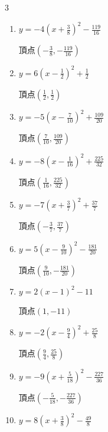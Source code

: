 \begin{multicols}{3}
\begin{enumerate}
        $\displaystyle 頂点\left( -\frac{9}{10} , -\frac{59}{20} \right)$

  \item $\displaystyle y=-4\left( x+\frac{3}{8}\right)^{2}-\frac{119}{16}$

        $\displaystyle 頂点\left( -\frac{3}{8} , -\frac{119}{16} \right)$

  \item $\displaystyle y=6\left( x-\frac{1}{2}\right)^{2}+\frac{1}{2}$

        $\displaystyle 頂点\left( \frac{1}{2} , \frac{1}{2} \right)$

  \item $\displaystyle y=-5\left( x-\frac{7}{10}\right)^{2}+\frac{109}{20}$

        $\displaystyle 頂点\left( \frac{7}{10} , \frac{109}{20} \right)$

  \item $\displaystyle y=-8\left( x-\frac{1}{16}\right)^{2}+\frac{225}{32}$

        $\displaystyle 頂点\left( \frac{1}{16} , \frac{225}{32} \right)$

  \item $\displaystyle y=-7\left( x+\frac{3}{7}\right)^{2}+\frac{37}{7}$

        $\displaystyle 頂点\left( -\frac{3}{7} , \frac{37}{7} \right)$

  \item $\displaystyle y=5\left( x-\frac{9}{10}\right)^{2}-\frac{181}{20}$

        $\displaystyle 頂点\left( \frac{9}{10} , -\frac{181}{20} \right)$

  \item $\displaystyle y=2\left( x-1\right)^{2}-11$

        $\displaystyle 頂点\left( 1 , -11 \right)$

\columnbreak %

  \item $\displaystyle y=-2\left( x-\frac{9}{4}\right)^{2}+\frac{25}{8}$

        $\displaystyle 頂点\left( \frac{9}{4} , \frac{25}{8} \right)$

  \item $\displaystyle y=-9\left( x+\frac{5}{18}\right)^{2}-\frac{227}{36}$

        $\displaystyle 頂点\left( -\frac{5}{18} , -\frac{227}{36} \right)$

  \item $\displaystyle y=8\left( x+\frac{3}{8}\right)^{2}-\frac{49}{8}$


\end{enumerate}
\end{multicols}
